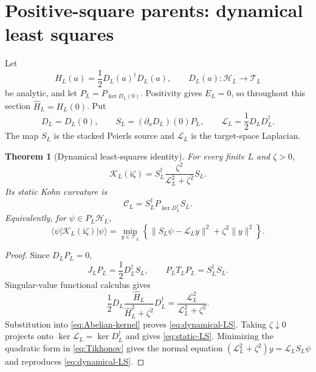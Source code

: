 \documentclass[11pt]{article}
\newtheorem{theorem}{Theorem}[section]
\theoremstyle{definition}
\theoremstyle{remark}
\newcommand{\cH}{\mathcal H}
\newcommand{\cK}{\mathcal K}
\newcommand{\cC}{\mathcal C}
\newcommand{\cL}{\mathcal L}
\newcommand{\cT}{\mathcal T}
\newcommand{\I}{\mathrm i}
\newcommand{\ket}[1]{\lvert #1\rangle}
\newcommand{\bra}[1]{\langle #1\rvert}
\newcommand{\norm}[1]{\lVert #1\rVert}
\begin{document}
\section{Positive-square parents: dynamical least squares}
\label{sec:least-squares}

Let
\begin{equation}
 H_L(a)=\frac12D_L(a)^\dagger D_L(a),
 \qquad
 D_L(a):\cH_L\to\cT_L
 \label{eq:positive-square}
\end{equation}
be analytic, and let $P_L=P_{\ker D_L(0)}$.  Positivity gives $E_L=0$, so throughout this section
$\widehat H_L=H_L(0)$.  Put
\begin{equation}
 D_L=D_L(0),
 \qquad
 S_L=(\partial_aD_L)(0)P_L,
 \qquad
 \cL_L=\frac12D_LD_L^\dagger.
 \label{eq:source-target-Laplacian}
\end{equation}
The map $S_L$ is the stacked Peierls source and $\cL_L$ is the target-space Laplacian.

\begin{theorem}[Dynamical least-squares identity]
\label{thm:dynamical-LS}
For every finite $L$ and $\zeta>0$,
\begin{equation}
 \boxed{
 \cK_L(\I\zeta)
 =S_L^\dagger\frac{\zeta^2}{\cL_L^2+\zeta^2}S_L.}
 \label{eq:dynamical-LS}
\end{equation}
Its static Kohn curvature is
\begin{equation}
 \boxed{\cC_L=S_L^\dagger P_{\ker D_L^\dagger}S_L.}
 \label{eq:static-LS}
\end{equation}
Equivalently, for $\psi\in P_L\cH_L$,
\begin{equation}
 \bra{\psi}\cK_L(\I\zeta)\ket{\psi}
 =\min_{y\in\cT_L}
 \left\{\norm{S_L\psi-\cL_Ly}^2+\zeta^2\norm{y}^2\right\}.
 \label{eq:Tikhonov}
\end{equation}
\end{theorem}

\begin{proof}
Since $D_LP_L=0$,
\begin{equation}
 J_LP_L=\frac12D_L^\dagger S_L,
 \qquad
 P_LT_LP_L=S_L^\dagger S_L.
\end{equation}
Singular-value functional calculus gives
\begin{equation}
 \frac12D_L\frac{\widehat H_L}{\widehat H_L^2+\zeta^2}D_L^\dagger
 =\frac{\cL_L^2}{\cL_L^2+\zeta^2}.
\end{equation}
Substitution into \eqref{eq:Abelian-kernel} proves \eqref{eq:dynamical-LS}.  Taking $\zeta\downarrow0$
projects onto $\ker\cL_L=\ker D_L^\dagger$ and gives \eqref{eq:static-LS}.  Minimizing the quadratic form
in \eqref{eq:Tikhonov} gives the normal equation
$(\cL_L^2+\zeta^2)y=\cL_LS_L\psi$ and reproduces \eqref{eq:dynamical-LS}.
\end{proof}
\end{document}
